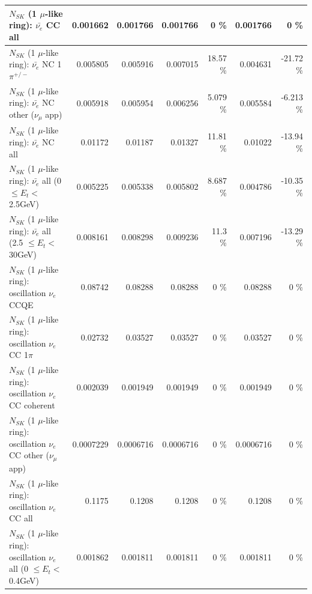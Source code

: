 \begin{table}
\begin{tabular}{| l | r | r | r  r | r  r |}
                            $N_{SK}$ (1 $\mu$-like ring): $\bar{\nu_{e}}$ CC all &        0.001662 &        0.001766 &        0.001766 &        0 \%  &        0.001766 &        0 \%  \\ 
\hline
                     $N_{SK}$ (1 $\mu$-like ring): $\bar{\nu_e}$ NC 1$\pi^{+/-}$ &        0.005805 &        0.005916 &        0.007015 &    18.57 \%  &        0.004631 &   -21.72 \%  \\ 
            $N_{SK}$ (1 $\mu$-like ring): $\bar{\nu_e}$ NC other ($\nu_\mu$ app) &        0.005918 &        0.005954 &        0.006256 &    5.079 \%  &        0.005584 &   -6.213 \%  \\ 
                            $N_{SK}$ (1 $\mu$-like ring): $\bar{\nu_{e}}$ NC all &         0.01172 &         0.01187 &         0.01327 &    11.81 \%  &         0.01022 &   -13.94 \%  \\ 
\hline
     $N_{SK}$ (1 $\mu$-like ring): $\bar{\nu_{e}}$ all (0 $\leq E_{t} <$ 2.5GeV) &        0.005225 &        0.005338 &        0.005802 &    8.687 \%  &        0.004786 &   -10.35 \%  \\ 
    $N_{SK}$ (1 $\mu$-like ring): $\bar{\nu_{e}}$ all (2.5 $\leq E_{t} <$ 30GeV) &        0.008161 &        0.008298 &        0.009236 &     11.3 \%  &        0.007196 &   -13.29 \%  \\ 
\hline
\hline
\hline
                          $N_{SK}$ (1 $\mu$-like ring): oscillation $\nu_e$ CCQE &         0.08742 &         0.08288 &         0.08288 &        0 \%  &         0.08288 &        0 \%  \\ 
                     $N_{SK}$ (1 $\mu$-like ring): oscillation $\nu_e$ CC 1$\pi$ &         0.02732 &         0.03527 &         0.03527 &        0 \%  &         0.03527 &        0 \%  \\ 
                   $N_{SK}$ (1 $\mu$-like ring): oscillation $\nu_e$ CC coherent &        0.002039 &        0.001949 &        0.001949 &        0 \%  &        0.001949 &        0 \%  \\ 
      $N_{SK}$ (1 $\mu$-like ring): oscillation $\nu_e$ CC other ($\nu_\mu$ app) &       0.0007229 &       0.0006716 &       0.0006716 &        0 \%  &       0.0006716 &        0 \%  \\ 
                       $N_{SK}$ (1 $\mu$-like ring): oscillation $\nu_e$  CC all &          0.1175 &          0.1208 &          0.1208 &        0 \%  &          0.1208 &        0 \%  \\ 
\hline
$N_{SK}$ (1 $\mu$-like ring): oscillation $\nu_{e}$ all (0 $\leq E_{t} <$ 0.4GeV) &        0.001862 &        0.001811 &        0.001811 &        0 \%  &        0.001811 &        0 \%  \\ 

\end{tabular}
\end{table}
